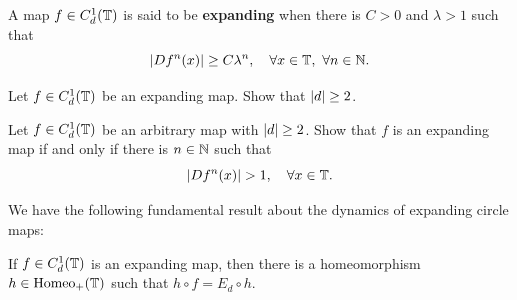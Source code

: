 \begin{definition}
  \label{def:expanding-circle-maps}
  A map $f\in C_d^1(\mathbb{T})$ is said to be \textbf{expanding} when there is $C>0$ and $\lambda>1$ such that
  \begin{displaymath}
    \left\lvert{Df^n(x)}\right\rvert\geq C\lambda^n, \quad\forall x\in\mathbb{T},\ \forall n\in\mathbb{N}.
  \end{displaymath}
\end{definition}

\begin{exercise}
  Let $f\in C_d^1(\mathbb{T})$ be an expanding map. Show that $\left\lvert{d}\right\rvert\geq 2$.
\end{exercise}

\begin{exercise}
  \label{exer:expanding-maps-equiv-definition}
  Let $f\in C_d^1(\mathbb{T})$ be an arbitrary map with $\left\lvert{d}\right\rvert\geq 2$. Show that $f$ is an expanding map if and only if there is $n\in\mathbb{N}$ such that
  \begin{displaymath}
    \left\lvert{Df^n(x)}\right\rvert>1, \quad\forall x\in\mathbb{T}.
  \end{displaymath}
\end{exercise}

We have the following fundamental result about the dynamics of expanding circle maps:
\begin{theorem}
  \label{thm:expanding-maps-topological-conjugacy}
  If $f\in C^1_d(\mathbb{T})$ is an expanding map, then there is a homeomorphism $h\in\mathrm{Homeo}_{+}(\mathbb{T})$ such that $h\circ f=E_d\circ h$.
\end{theorem}

